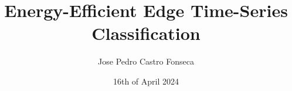\documentclass[]{iisreport}
\title{Energy-Efficient Edge Time-Series Classification}
\author{Jose Pedro Castro Fonseca}
\date{16th of April 2024}
\begin{document}
\frontmatter





\tableofcontents

\mainmatter



%




\appendix

%

\backmatter

%
\listofacronyms

\listoffigures
\listoftables


\end{document}
